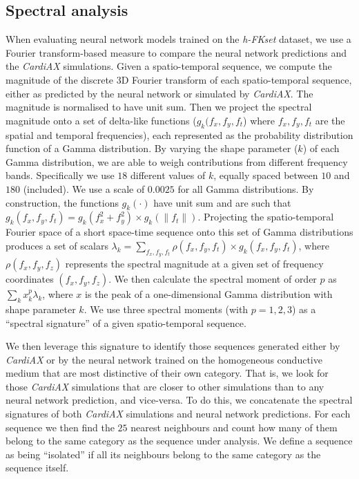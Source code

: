 \documentclass[utf8]{frontiers_suppmat} %
\begin{document}
\subsection{Spectral analysis}
\label{sec:supp:homogeneous:spectral}
When evaluating neural network models trained on the \textit{h-FKset} dataset, we use a Fourier transform-based measure to compare the neural network predictions and the \textit{CardiAX} simulations. Given a spatio-temporal sequence, we compute the magnitude of the discrete 3D Fourier transform of each spatio-temporal sequence, either as predicted by the neural network or simulated by \textit{CardiAX}. The magnitude is normalised to have unit sum. Then we project the spectral magnitude onto a set of delta-like functions ($g_k(f_x,f_y,f_t$) where $f_x,f_y,f_t$ are the spatial and temporal frequencies), each represented as the probability distribution function of a Gamma distribution. By varying the shape parameter ($k$) of each Gamma distribution, we are able to weigh contributions from different frequency bands. Specifically we use $18$ different values of $k$, equally spaced between $10$ and $180$ (included). We use a scale of $0.0025$ for all Gamma distributions. By construction, the functions $g_k(\cdot)$ have unit sum and are such that $g_k(f_x,f_y,f_t) = g_k(f_x^2+f_y^2)\times g_k(\|f_t\|)$. Projecting the spatio-temporal Fourier space of a short space-time sequence onto this set of Gamma distributions produces a set of scalars $\lambda_k = \sum_{f_x,f_y,f_t}{\rho(f_x,f_y,f_t)\times g_k(f_x,f_y,f_t)}$, where $\rho(f_x,f_y,f_z)$ represents the spectral magnitude at a given set of frequency coordinates $(f_x, f_y, f_z)$. We then calculate the spectral moment of order $p$ as $\sum_k{x_k^p \lambda_k}$, where $x$ is the peak of a one-dimensional Gamma distribution with shape parameter $k$. We use three spectral moments (with $p=1,2,3$) as a ``spectral signature'' of a given spatio-temporal sequence.

We then leverage this signature to identify those sequences generated either by \textit{CardiAX} or by the neural network trained on the homogeneous conductive medium that are most distinctive of their own category. That is, we look for those \textit{CardiAX} simulations that are closer to other simulations than to any neural network prediction, and vice-versa. To do this, we concatenate the spectral signatures of both \textit{CardiAX} simulations and neural network predictions. For each sequence we then find the $25$ nearest neighbours and count how many of them belong to the same category as the sequence under analysis. We define a sequence as being ``isolated'' if all its neighbours belong to the same category as the sequence itself.
\end{document}

